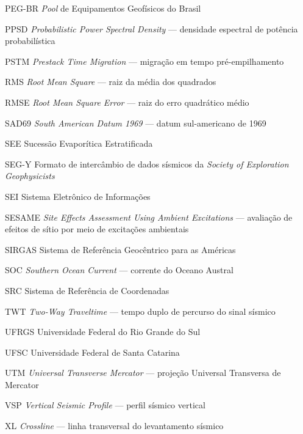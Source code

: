 \begin{siglas}
  \item[PEG-BR] \textit{Pool} de Equipamentos Geofísicos do Brasil
  \item[PPSD] \textit{Probabilistic Power Spectral Density} — densidade espectral de potência probabilística
  \item[PSTM] \textit{Prestack Time Migration} — migração em tempo pré-empilhamento
  \item[RMS] \textit{Root Mean Square} — raiz da média dos quadrados
  \item[RMSE] \textit{Root Mean Square Error} — raiz do erro quadrático médio
  \item[SAD69] \textit{South American Datum 1969} — datum sul-americano de 1969
  \item[SEE] Sucessão Evaporítica Estratificada
  \item[SEG-Y] Formato de intercâmbio de dados sísmicos da \textit{Society of Exploration Geophysicists}
  \item[SEI] Sistema Eletrônico de Informações
  \item[SESAME] \textit{Site Effects Assessment Using Ambient Excitations} — avaliação de efeitos de sítio por meio de excitações ambientais
  \item[SIRGAS] Sistema de Referência Geocêntrico para as Américas
  \item[SOC] \textit{Southern Ocean Current} — corrente do Oceano Austral
  \item[SRC] Sistema de Referência de Coordenadas
  \item[TWT] \textit{Two-Way Traveltime} — tempo duplo de percurso do sinal sísmico
  \item[UFRGS] Universidade Federal do Rio Grande do Sul
  \item[UFSC] Universidade Federal de Santa Catarina
  \item[UTM] \textit{Universal Transverse Mercator} — projeção Universal Transversa de Mercator
  \item[VSP] \textit{Vertical Seismic Profile} — perfil sísmico vertical
  \item[XL] \textit{Crossline} — linha transversal do levantamento sísmico
\end{siglas}
\cleardoublepage
